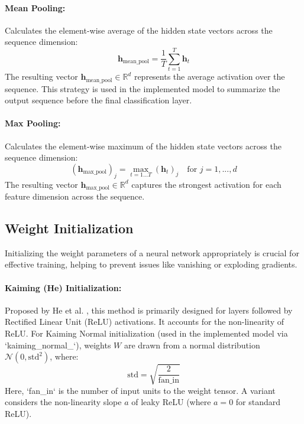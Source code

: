 \begin{appendices}
  \paragraph{Mean Pooling:}
  Calculates the element-wise average of the hidden state vectors across the sequence dimension:
  \begin{equation}
    \bm{h}_{\text{mean\_pool}} = \frac{1}{T} \sum_{t=1}^T \bm{h}_t
  \end{equation}
  The resulting vector \( \bm{h}_{\text{mean\_pool}} \in \mathbb{R}^d \) represents the average activation over the sequence. This strategy is used in the implemented model to summarize the output sequence before the final classification layer.

  \paragraph{Max Pooling:}
  Calculates the element-wise maximum of the hidden state vectors across the sequence dimension:
  \begin{equation}
    (\bm{h}_{\text{max\_pool}})_j = \max_{t=1...T} (\bm{h}_t)_j \quad \text{for } j = 1, ..., d
  \end{equation}
  The resulting vector \( \bm{h}_{\text{max\_pool}} \in \mathbb{R}^d \) captures the strongest activation for each feature dimension across the sequence.

  \subsection{Weight Initialization}
  Initializing the weight parameters of a neural network appropriately is crucial for effective training, helping to prevent issues like vanishing or exploding gradients.

  \paragraph{Kaiming (He) Initialization:}
  Proposed by He et al. \autocite{he2015delving}, this method is primarily designed for layers followed by Rectified Linear Unit (ReLU) activations. It accounts for the non-linearity of ReLU. For Kaiming Normal initialization (used in the implemented model via `kaiming_normal_`), weights \( W \) are drawn from a normal distribution \( \mathcal{N}(0, \text{std}^2) \), where:
  \begin{equation}
    \text{std} = \sqrt{\frac{2}{\text{fan\_in}}}
  \end{equation}
  Here, `fan_in` is the number of input units to the weight tensor. A variant considers the non-linearity slope \( a \) of leaky ReLU (where \( a=0 \) for standard ReLU).


\end{appendices}
